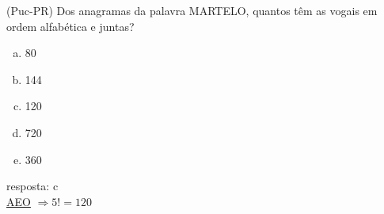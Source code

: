 \begin{ex}
 (Puc-PR) Dos anagramas da palavra MARTELO, quantos têm as vogais em ordem alfabética e juntas?
    \begin{enumerate}[(a)]
    \item 80
    \item 144
    \item 120
    \item 720
    \item 360
    \end{enumerate}
      \begin{sol}
      resposta: c  \\
       \underline{AEO}  \underline{\phantom{AA}}
       \underline{\phantom{AA}} \underline{\phantom{AA}} 
       \underline{\phantom{AA}} $\Longrightarrow 5!=120$
      \end{sol}
\end{ex}